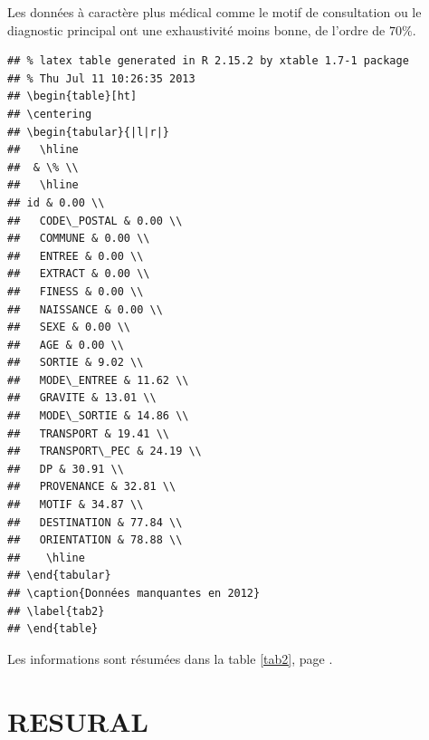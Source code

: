 \documentclass[12pt,english,french]{report}\usepackage{graphicx, color}
\makeatletter
\newenvironment{kframe}{%
 \def\at@end@of@kframe{}%
 \ifinner\ifhmode%
  \def\at@end@of@kframe{\end{minipage}}%
  \begin{minipage}{\columnwidth}%
 \fi\fi%
 \def\FrameCommand##1{\hskip\@totalleftmargin \hskip-\fboxsep
 \colorbox{shadecolor}{##1}\hskip-\fboxsep
     \hskip-\linewidth \hskip-\@totalleftmargin \hskip\columnwidth}%
 \MakeFramed {\advance\hsize-\width
   \@totalleftmargin\z@ \linewidth\hsize
   \@setminipage}}%
 {\par\unskip\endMakeFramed%
 \at@end@of@kframe}
\newenvironment{knitrout}{}{} %
\makeatother
\begin{document}
Les données à caractère plus médical comme le motif de consultation ou le diagnostic principal ont une exhaustivité moins bonne, de l'ordre de $70\%$.

\begin{knitrout}
\color{fgcolor}\begin{kframe}
\begin{verbatim}
## % latex table generated in R 2.15.2 by xtable 1.7-1 package
## % Thu Jul 11 10:26:35 2013
## \begin{table}[ht]
## \centering
## \begin{tabular}{|l|r|}
##   \hline
##  & \% \\ 
##   \hline
## id & 0.00 \\ 
##   CODE\_POSTAL & 0.00 \\ 
##   COMMUNE & 0.00 \\ 
##   ENTREE & 0.00 \\ 
##   EXTRACT & 0.00 \\ 
##   FINESS & 0.00 \\ 
##   NAISSANCE & 0.00 \\ 
##   SEXE & 0.00 \\ 
##   AGE & 0.00 \\ 
##   SORTIE & 9.02 \\ 
##   MODE\_ENTREE & 11.62 \\ 
##   GRAVITE & 13.01 \\ 
##   MODE\_SORTIE & 14.86 \\ 
##   TRANSPORT & 19.41 \\ 
##   TRANSPORT\_PEC & 24.19 \\ 
##   DP & 30.91 \\ 
##   PROVENANCE & 32.81 \\ 
##   MOTIF & 34.87 \\ 
##   DESTINATION & 77.84 \\ 
##   ORIENTATION & 78.88 \\ 
##    \hline
## \end{tabular}
## \caption{Données manquantes en 2012} 
## \label{tab2}
## \end{table}
\end{verbatim}
\end{kframe}
\end{knitrout}



Les informations sont résumées dans la table \ref{tab2}, page \pageref{tab2}.

\chapter{RESURAL}
\end{document}
